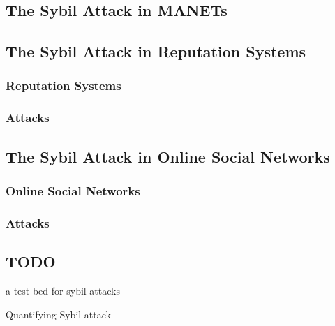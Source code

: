 \subsection{The Sybil Attack in MANETs}

\subsection{The Sybil Attack in Reputation Systems}

\subsubsection{Reputation Systems}
\subsubsection{Attacks}

\subsection{The Sybil Attack in Online Social Networks}
\subsubsection{Online Social Networks}
\subsubsection{Attacks}

\subsection{TODO}
a test bed for sybil attacks\cite{irissappane2012towards}

Quantifying Sybil attack\cite{margolin2008quantifying}

